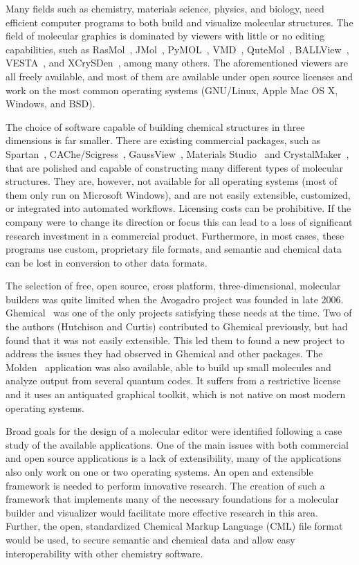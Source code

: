 \documentclass[10pt]{bmc_article}
\newenvironment{bmcformat}{\begin{raggedright}
\baselineskip20pt\sloppy\setboolean{publ}{false}}{\end{raggedright}
\baselineskip20pt\sloppy}
\begin{document}
\begin{bmcformat}
Many fields such as chemistry, materials science, physics, and biology, need
efficient computer programs to both build and visualize molecular structures.
The field of molecular graphics is dominated by viewers with little or no
editing capabilities, such as RasMol~\cite{RasMol}, JMol~\cite{JMol},
PyMOL~\cite{PyMOL}, VMD~\cite{VMD}, QuteMol~\cite{QuteMol},
BALLView~\cite{BALLView}, VESTA~\cite{vesta3}, and
XCrySDen~\cite{xcrysden1}\cite{xcrysden2}, among many others. The aforementioned
viewers are all freely available, and most of them are available under
open source licenses and work on the most common operating systems
(GNU/Linux, Apple Mac OS X, Windows, and BSD).

The choice of software capable of building chemical structures in
three dimensions is far smaller.
There are existing commercial packages, such as
Spartan~\cite{Spartan}, CAChe/Scigress~\cite{CAChe},
GaussView~\cite{GaussView}, Materials Studio~\cite{Accelrys} and
CrystalMaker~\cite{CrystalMaker}, that are polished and capable of
constructing many different types of molecular structures. They are,
however, not available for all operating systems (most of them only
run on Microsoft Windows), and are not easily extensible, customized,
or integrated into automated workflows. Licensing costs can be
prohibitive. If the company were to change its direction or focus this
can lead to a loss of significant research investment in a commercial
product. Furthermore, in most cases, these programs use custom,
proprietary file formats, and semantic and chemical data can be lost in
conversion to other data formats.

The selection of free, open source, cross platform, three-dimensional,
molecular builders was quite limited when the Avogadro project was founded in late 2006.
Ghemical~\cite{Ghemical} was one of the only projects satisfying these needs at
the time. Two of the authors (Hutchison and Curtis) contributed to Ghemical
previously, but had found that it was not easily extensible. This led them to
found a new project to address the issues they had observed in Ghemical
and other packages. The Molden~\cite{Molden} application was also available,
able to build up small molecules and analyze output from several quantum codes.
It suffers from a restrictive license and it uses an antiquated graphical
toolkit, which is not native on most modern operating systems.

Broad goals for the design of a molecular editor were identified following a
case study of the available applications. One of the main issues with both
commercial and open source applications is a lack of extensibility, many of the
applications also only work on one or two operating systems. An open and
extensible framework is needed to perform innovative research. The
creation of such a framework that implements many of the necessary foundations
for a molecular builder and visualizer would facilitate more effective research
in this area. Further, the open, standardized Chemical Markup Language
(CML) file format~\cite{CML2011a, CML2011b} would be used, to secure
semantic and chemical data and allow easy interoperability with other
chemistry software.


\end{bmcformat}
\end{document}

